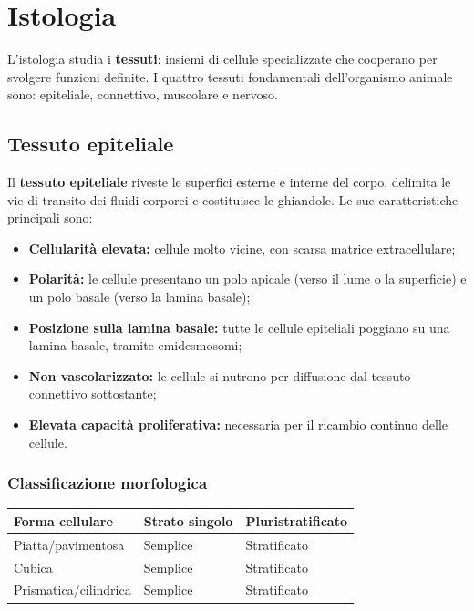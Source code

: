 \documentclass[11pt,a4paper,openright,twoside]{book}
\theoremstyle{definition}
\theoremstyle{plain}
\theoremstyle{remark}
\begin{document}
\chapter{Istologia}

\begin{tcolorbox}[summarybox, title={Sommario del capitolo}]
L'istologia studia i \textbf{tessuti}: insiemi di cellule specializzate che cooperano per svolgere funzioni definite. I quattro tessuti fondamentali dell'organismo animale sono: epiteliale, connettivo, muscolare e nervoso.
\end{tcolorbox}

\section{Tessuto epiteliale}

Il \textbf{tessuto epiteliale} riveste le superfici esterne e interne del corpo, delimita le vie di transito dei fluidi corporei e costituisce le ghiandole. Le sue caratteristiche principali sono:
\begin{itemize}
  \item \textbf{Cellularità elevata:} cellule molto vicine, con scarsa matrice extracellulare;
  \item \textbf{Polarità:} le cellule presentano un polo apicale (verso il lume o la superficie) e un polo basale (verso la lamina basale);
  \item \textbf{Posizione sulla lamina basale:} tutte le cellule epiteliali poggiano su una lamina basale, tramite emidesmosomi;
  \item \textbf{Non vascolarizzato:} le cellule si nutrono per diffusione dal tessuto connettivo sottostante;
  \item \textbf{Elevata capacità proliferativa:} necessaria per il ricambio continuo delle cellule.
\end{itemize}

\subsection{Classificazione morfologica}

\begin{center}
\begin{tabular}{lll}
\toprule
\textbf{Forma cellulare} & \textbf{Strato singolo} & \textbf{Pluristratificato} \\
\midrule
Piatta/pavimentosa & Semplice & Stratificato \\
Cubica & Semplice & Stratificato \\
Prismatica/cilindrica & Semplice & Stratificato \\
\bottomrule
\end{tabular}
\end{center}
\end{document}

